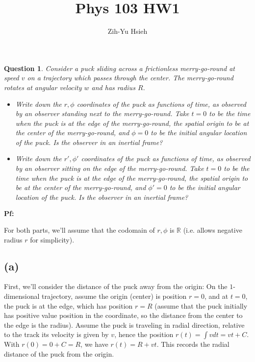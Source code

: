 \documentclass{article}
\title{Phys 103 HW1}
\author{Zih-Yu Hsieh}
\newtheorem{question}{Question}
\newcommand{\RR}{\mathbb{R}}
\begin{document}
\maketitle

\section{}%
\begin{question}\label{q1}
    Consider a puck sliding across a frictionless merry-go-round at speed $v$ on a trajectory which passes through the center. The merry-go-round rotates at angular velocity $w$ and has radius $R$.
    \begin{itemize}
        \item[(a)] Write down the $r,\phi$ coordinates of the puck as functions of time, as observed by an observer standing next to the merry-go-round. Take $t=0$ to be the time when the puck is at the edge of the merry-go-round, the spatial origin to be at the center of the merry-go-round, and $\phi=0$ to be the initial angular location of the puck. Is the observer in an inertial frame?
        \item[(b)] Write down the $r', \phi'$ coordinates of the puck as functions of time, as observed by an observer sitting on the edge of the merry-go-round. Take $t=0$ to be the time when the puck is at the edge of the merry-go-round, the spatial origin to be at the center of the merry-go-round, and $\phi'=0$ to be the initial angular location of the puck. Is the observer in an inertial frame?
    \end{itemize}
\end{question}

\textbf{Pf:}

For both parts, we'll assume that the codomain of $r,\phi$ is $\RR$ (i.e. allows negative radius $r$ for simplicity).
\subsection*{(a)}
First, we'll consider the distance of the puck away from the origin: On the $1$-dimensional trajectory, assume the origin (center) is position $r=0$, and at $t=0$, the puck is at the edge, which has position $r=R$ (assume that the puck initially has positive value position in the coordinate, so the distance from the center to the edge is the radius). Assume the puck is traveling in radial direction, relative to
 the track its velocity is given by $v$, hence the position $r(t) = \int vdt = vt+C$. With $r(0) = 0+C = R$, we have $r(t)=R+vt$. This records the radial distance of the puck from the origin.
\end{document}
